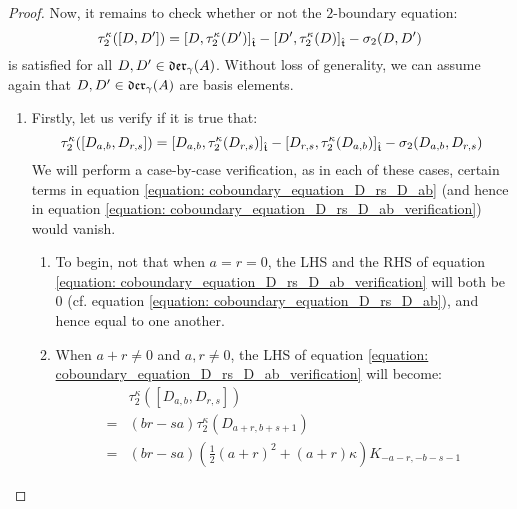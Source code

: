 \begin{proof}
                Now, it remains to check whether or not the $2$-boundary equation:
                    \begin{equation} \label{equation: coboundary_verification_tau_2}
                        \tau_2^{\kappa}([D, D']) = [D, \tau_2^{\kappa}(D')]_{\hat{\mathfrak{t}}} - [D', \tau_2^{\kappa}(D)]_{\hat{\mathfrak{t}}} - \sigma_2(D, D')
                    \end{equation}
                is satisfied for all $D, D' \in \divzero$. Without loss of generality, we can assume again that $D, D' \in \divzero$ are basis elements.
                \begin{enumerate}
                    \item Firstly, let us verify if it is true that:
                        \begin{equation} \label{equation: coboundary_equation_D_rs_D_ab_verification}
                            \tau_2^{\kappa}([D_{a, b}, D_{r, s}]) = [D_{a, b}, \tau_2^{\kappa}(D_{r, s})]_{\hat{\mathfrak{t}}} - [D_{r, s}, \tau_2^{\kappa}(D_{a, b})]_{\hat{\mathfrak{t}}} - \sigma_2(D_{a, b}, D_{r, s})
                        \end{equation}
                    We will perform a case-by-case verification, as in each of these cases, certain terms in equation \eqref{equation: coboundary_equation_D_rs_D_ab} (and hence in equation \eqref{equation: coboundary_equation_D_rs_D_ab_verification}) would vanish.
                    \begin{enumerate}
                        \item To begin, not that when $a = r = 0$, the LHS and the RHS of equation \eqref{equation: coboundary_equation_D_rs_D_ab_verification} will both be $0$ (cf. equation \eqref{equation: coboundary_equation_D_rs_D_ab}), and hence equal to one another.
                        \item When $a + r \not = 0$ and $a, r \not = 0$, the LHS of equation \eqref{equation: coboundary_equation_D_rs_D_ab_verification} will become:
                            $$
                                \begin{aligned}
                                    & \tau_2^{\kappa}([D_{a, b}, D_{r, s}])
                                    \\
                                    = & (br - sa) \tau_2^{\kappa}(D_{a + r, b + s + 1})
                                    \\
                                    = & (br - sa) \left( \frac12 (a + r)^2 + (a + r)\kappa \right) K_{-a - r, -b - s - 1}

\end{aligned}$$
\end{enumerate}
\end{enumerate}
\end{proof}
